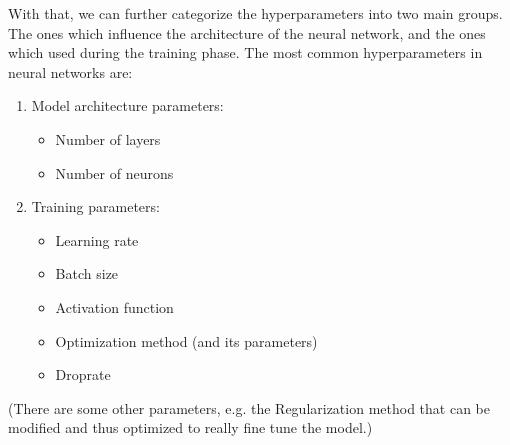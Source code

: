 \documentclass[conference]{IEEEtran}
\begin{document}
With that, we can further categorize the hyperparameters into two main groups. The ones which influence the architecture of the neural network, and the ones which used during the training phase. The most common hyperparameters in neural networks are:
\begin{enumerate}
    \item Model architecture parameters:
    \begin{itemize}
        \item Number of layers
        \item Number of neurons
    \end{itemize}
    \item Training parameters:
    \begin{itemize}
        \item Learning rate
        \item Batch size
        \item Activation function
        \item Optimization method (and its parameters)
        \item Droprate
    \end{itemize}
\end{enumerate}
(There are some other parameters, e.g. the Regularization method that can be modified and thus optimized to really fine tune the model.)
\end{document}
